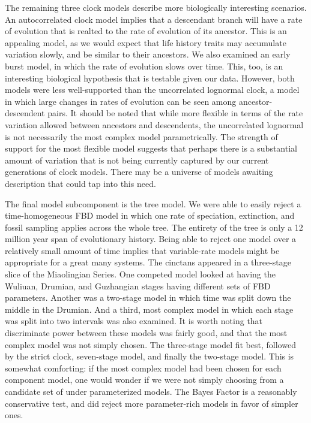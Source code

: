 \documentclass{article}
\begin{document}
The remaining three clock models describe more biologically interesting scenarios.
An autocorrelated clock model implies that a descendant branch will have a rate of evolution that is realted to the rate of evolution of its ancestor.
This is an appealing model, as we would expect that life history traits may accumulate variation slowly, and be similar to their ancestors. 
We also examined an early burst model, in which the rate of evolution slows over time.
This, too, is an interesting biological hypothesis that is testable given our data.
However, both models were less well-supported than the uncorrelated lognormal clock,
a model in which large changes in rates of evolution can be seen among ancestor-descendent pairs.
It should be noted that while more flexible in terms of the rate variation allowed between ancestors and descendents, the uncorrelated lognormal is not necessarily the most complex model parametrically. 
The strength of support for the most flexible model suggests that perhaps there is a substantial amount of variation that is not being currently captured by our current generations of clock models.
There may be a universe of models awaiting description that could tap into this need.

The final model subcomponent is the tree model.
We were able to easily reject a time-homogeneous FBD model in which one rate of speciation, extinction, and fossil sampling applies across the whole tree.
The entirety of the tree is only a 12 million year span of evolutionary history.
Being able to reject one model over a relatively small amount of time implies that variable-rate models might be appropriate for a great many systems.
The cinctans appeared in a three-stage slice of the Miaolingian Series. 
One competed model looked at having the Wuliuan, Drumian, and Guzhangian stages having different sets of FBD parameters. 
Another was  a two-stage model in which time was split down the middle in the Drumian.
And a third, most complex model in which each stage was split into two intervals was also examined. 
It is worth noting that discriminate power between these models was fairly good, and that the most complex model was not simply chosen.
The three-stage model fit best, followed by the strict clock, seven-stage model, and finally the two-stage model. 
This is somewhat comforting: if the most complex model had been chosen for each component model, one would wonder if we were not simply choosing from a candidate set of under parameterized models. 
The Bayes Factor is a reasonably conservative test, and did reject more parameter-rich models in favor of simpler ones.
\end{document}
